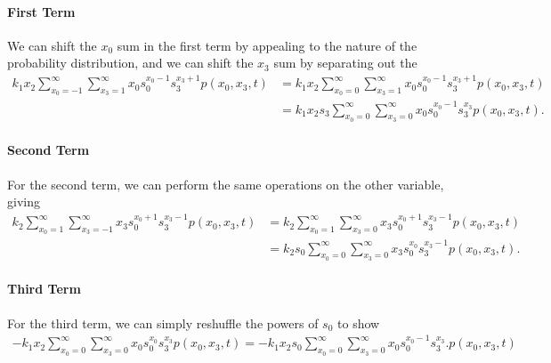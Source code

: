 \documentclass[11pt,a4paper]{article}
\begin{document}
\paragraph{First Term}
We can shift the $x_0$ sum in the first term by appealing to the nature of the probability distribution, and we can shift the $x_3$ sum by separating out the 
\begin{align*}
k_1 x_2 \sum_{x_0=-1}^{\infty} \sum_{x_3=1}^{\infty} x_0 s_0^{x_0-1} s_3^{x_3+1} p(x_0,x_3,t) &= k_1 x_2 \sum_{x_0=0}^{\infty} \sum_{x_3=1}^{\infty} x_0 s_0^{x_0-1} s_3^{x_3+1} p(x_0,x_3,t) \\ 
&= k_1 x_2 s_3 \sum_{x_0=0}^{\infty} \sum_{x_3=0}^{\infty} x_0 s_0^{x_0-1} s_3^{x_3}  p(x_0,x_3,t).
\end{align*}
\paragraph{Second Term}
For the second term, we can perform the same operations on the other variable, giving
\begin{align*}
k_2 \sum_{x_0 = 1}^\infty \sum_{x_3=-1}^\infty x_3 s_0^{x_0+1} s_3^{x_3-1} p(x_0,x_3,t) &= 
k_2 \sum_{x_0 = 1}^\infty \sum_{x_3=0}^\infty x_3 s_0^{x_0+1} s_3^{x_3-1} p(x_0,x_3,t) \\
&= k_2 s_0 \sum_{x_0 = 0}^\infty \sum_{x_3=0}^\infty x_3 s_0^{x_0} s_3^{x_3-1} p(x_0,x_3,t).
\end{align*}
\paragraph{Third Term}
For the third term, we can simply reshuffle the powers of $s_0$ to show 
\begin{align*}
- k_1 x_2 \sum_{x_0 = 0}^\infty \sum_{x_3 = 0}^\infty x_0 s_0^{x_0} s_3^{x_3} p(x_0,x_3,t) = 
-k_1 x_2 s_0 \sum_{x_0 = 0}^\infty \sum_{x_3 = 0}^\infty x_0 s_0^{x_0-1} s_3^{x_3}.  p(x_0,x_3,t)
\end{align*}
\\
\end{document}
